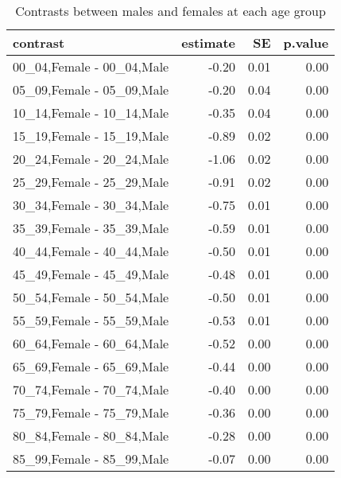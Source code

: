 \begin{table}[ht]
\centering
\begin{tabular}{lrrr}
  \hline
contrast & estimate & SE & p.value \\ 
  \hline
00\_04,Female - 00\_04,Male & -0.20 & 0.01 & 0.00 \\ 
  05\_09,Female - 05\_09,Male & -0.20 & 0.04 & 0.00 \\ 
  10\_14,Female - 10\_14,Male & -0.35 & 0.04 & 0.00 \\ 
  15\_19,Female - 15\_19,Male & -0.89 & 0.02 & 0.00 \\ 
  20\_24,Female - 20\_24,Male & -1.06 & 0.02 & 0.00 \\ 
  25\_29,Female - 25\_29,Male & -0.91 & 0.02 & 0.00 \\ 
  30\_34,Female - 30\_34,Male & -0.75 & 0.01 & 0.00 \\ 
  35\_39,Female - 35\_39,Male & -0.59 & 0.01 & 0.00 \\ 
  40\_44,Female - 40\_44,Male & -0.50 & 0.01 & 0.00 \\ 
  45\_49,Female - 45\_49,Male & -0.48 & 0.01 & 0.00 \\ 
  50\_54,Female - 50\_54,Male & -0.50 & 0.01 & 0.00 \\ 
  55\_59,Female - 55\_59,Male & -0.53 & 0.01 & 0.00 \\ 
  60\_64,Female - 60\_64,Male & -0.52 & 0.00 & 0.00 \\ 
  65\_69,Female - 65\_69,Male & -0.44 & 0.00 & 0.00 \\ 
  70\_74,Female - 70\_74,Male & -0.40 & 0.00 & 0.00 \\ 
  75\_79,Female - 75\_79,Male & -0.36 & 0.00 & 0.00 \\ 
  80\_84,Female - 80\_84,Male & -0.28 & 0.00 & 0.00 \\ 
  85\_99,Female - 85\_99,Male & -0.07 & 0.00 & 0.00 \\ 
   \hline
\end{tabular}
\caption{Contrasts between males and females at each age group} 
\label{tab:mf}
\end{table}
